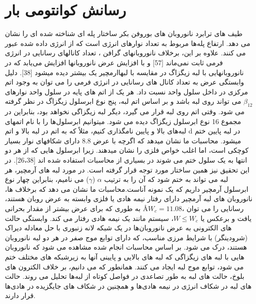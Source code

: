 \section{رسانش کوانتومی بار}
طیف های ترابرد نانوروبان های بوروفن بکر  ساختار پله ای شناخته شده ای را نشان می دهد. ارتفاع پله‌ها مربوط به تعداد نوارهای انرژی است که از انرژی داده شده عبور می کنند. علاوه بر این، برخلاف نانوروبانهای گرافن ، تعداد کانالهای رسانایی در انرژی فرمی ثابت نمی‌ماند [57] و با افزایش عرض نانوروبانها افزایش می‌یابد که در نانوروبانهایی با لبه زیگزاگ در مقایسه با لبهاارمچیر یک بیشتر دیده میشود [38]. دلیل وابستگی عرض به تعداد کانال های رسانایی در انرژی فرمی را می توان به وجود اتم مرکزی در داخل سلول واحد نسبت داد. هر یک از اتم های پایه در سلول واحد نوارهای $\beta_{12}$ می تواند روی لبه باشد و بر اساس اتم لبه، پنج نوع ابرسلول زیگزاگ در نظر گرفته می شود. وقتی اتم  روی لبه قرار می گیرد، دیگر لبه زیگزاگی نخواهد بود، بنابراین در مجموع 16 نوع ابرسلول زیگزاگ دیده می شود. میتوانیم ابرسلول‌ها را با نام اتمهای لبه‌های بالا و پایین نامگذاری کنیم، مثلاً  که به اتم  در لبه بالا و اتم d در لبه پایین ختم میشود. محاسبات ما نشان میدهد که اگرچه  با عرض\lr{\AA} 8.8 دارای شکافهای نوار بسیار کوچکی است، اما اغلب خواص فلزی را نشان میدهند. زیرا ابرسلول هایی که از هر دو انتها به یک سلول ختم می شوند در بسیاری از محاسبات استفاده شده اند [26،38]. در این تحقیق نیز همین ساختار مورد توجه قرار گرفته است. در مورد لبه های آرمچیر، هر لبه می تواند به  ختم شود که آن را به ترتیب $\alpha$ ($\gamma$) می نامیم، بنابراین چهار نوع ابرسلول آرمچیر داریم که یک نمونه آناست.محاسبات ما نشان می دهد که برخلاف  ها، نانوروبان های لبه آرمچیر دارای رفتار نیمه هادی یا فلزی وابسته به عرض روبان  هستند، به طوری که برای عرض بیشتر از مقدار بحرانی \AA $W_c = 11.08$، رسانایی را می توان یافت و برعکس یا $W\leq W_c$، سیستم مانند یک نیمه هادی رفتار می کند. وابستگی حالت های الکترونی به عرض نانوروبان‌ها در یک شبکه لانه زنبوری با حل معادله دیراک (شرودینگر) با شرایط مرزی مناسب، که دارای توابع موج صفر در هر دو لبه نانوروبان هستند، درک می شود. بر اساس محاسبات انجام شده مشاهده می شود که نانوروبان هایی با لبه های زیگزاگی که لبه های بالایی و پایینی آنها به زیرشبکه های مختلف ختم می شود، توابع موج لبه ایجاد می کنند. همانطور که می دانیم، بر خلاف الکترون های بلوخ، حالت های لبه به طور تصاعدی در فواصل کوتاه از لبه‌ها تحلیل می روند. حالت های لبه در شکاف انرژی در نیمه هادی‌ها و همچنین در شکاف های جایگزیده در هادی‌ها قرار دارند.


